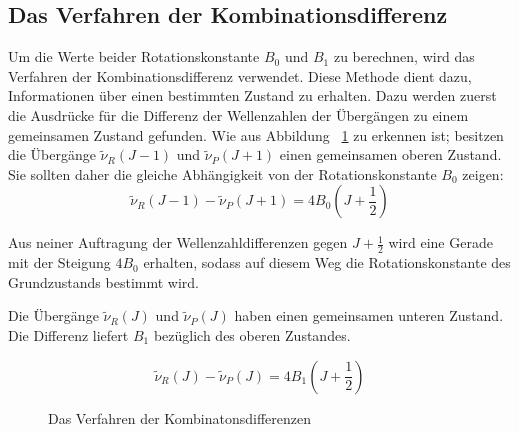 \documentclass[12pt]{article}
\begin{document}
\subsection{Das Verfahren der Kombinationsdifferenz~\supercite{atkins}}
Um die Werte beider Rotationskonstante $B_0$ und $B_1$ zu berechnen, wird das Verfahren der Kombinationsdifferenz verwendet. Diese
Methode dient dazu, Informationen über einen bestimmten Zustand zu erhalten. Dazu werden zuerst die Ausdrücke für die Differenz der Wellenzahlen der Übergängen zu einem gemeinsamen Zustand gefunden.
Wie aus Abbildung ~\ref{fig:kombi} zu erkennen ist; besitzen die Übergänge  $\tilde{\nu} _R (J-1)$ und $\tilde{\nu} _P (J+1)$ einen gemeinsamen oberen Zustand. Sie sollten daher die gleiche Abhängigkeit von der Rotationskonstante $B_0$ zeigen:
\begin{equation}
\tilde{\nu} _R (J-1) - \tilde{\nu} _P (J+1) = 4 B_0 (J+\frac{1}{2})
\end{equation}

Aus neiner Auftragung der Wellenzahldifferenzen gegen $J + \frac{1}{2}$ wird eine Gerade mit der Steigung $4B_0$ erhalten, sodass auf diesem Weg die Rotationskonstante des Grundzustands bestimmt wird.

Die Übergänge  $\tilde{\nu} _R (J)$ und $\tilde{\nu} _P (J)$ haben einen gemeinsamen unteren Zustand. Die Differenz liefert $B_1$ bezüglich des oberen Zustandes.

\begin{equation}
\tilde{\nu} _R (J) - \tilde{\nu} _P (J) = 4 B_1 (J+\frac{1}{2})
\end{equation}


\begin{figure}[!htbp]

      \caption{Das Verfahren der Kombinatonsdifferenzen}
      \label{fig:kombi}

\end{figure}
\end{document}
